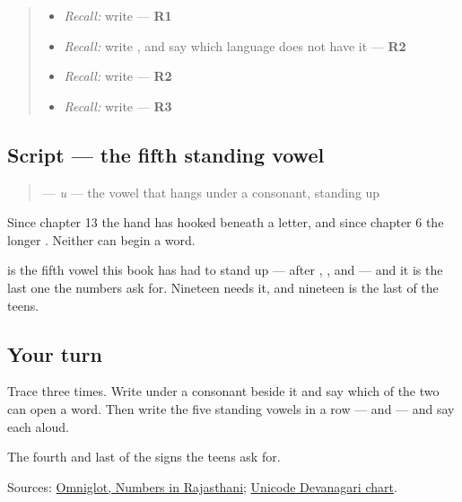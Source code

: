 \label{lesson:MW-W38-u}



\begin{quote}
\begin{itemize}
\raggedright
  \item \emph{Recall:} write \textbf{} — \textbf{R1}
  \item \emph{Recall:} write \textbf{}, and say which language does not have it — \textbf{R2}
  \item \emph{Recall:} write \textbf{} — \textbf{R2}
  \item \emph{Recall:} write \textbf{} — \textbf{R3}
\end{itemize}
\end{quote}

\subsection*{Script — the fifth standing vowel}

\begin{quote}
\textbf{} — \emph{u} — the vowel that hangs under a consonant, standing up
\end{quote}

Since chapter 13 the hand has hooked \textbf{} beneath a letter, and since chapter 6 the longer \textbf{}. Neither can begin a word.

\textbf{} is the fifth vowel this book has had to stand up — after \textbf{}, \textbf{}, \textbf{} and \textbf{} — and it is the last one the numbers ask for. Nineteen needs it, and nineteen is the last of the teens.

\subsection*{Your turn}
Trace \textbf{} three times. Write \textbf{} under a consonant beside it and say which of the two can open a word. Then write the five standing vowels in a row — \textbf{   } and \textbf{} — and say each aloud.

\begin{tcolorbox}[breakable,colback=teal!4,colframe=teal!35!black,title={Before you move on}]
The fourth and last of the signs the teens ask for.

Sources: \href{https://www.omniglot.com/language/numbers/rajasthani.htm}{Omniglot, Numbers in Rajasthani}; \href{https://www.unicode.org/charts/PDF/U0900.pdf}{Unicode Devanagari chart}.
\end{tcolorbox}
